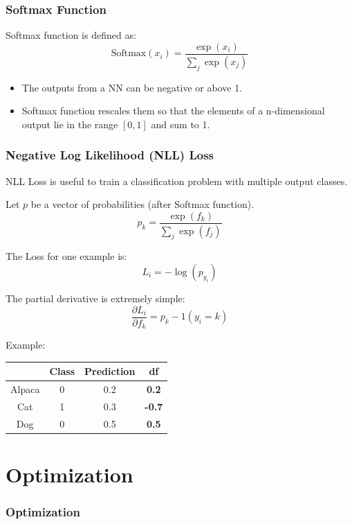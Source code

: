 \documentclass[aspectratio=169, 10pt]{beamer}
\begin{document}
\begin{frame}
    \frametitle{Softmax Function}
    Softmax function is defined as:
    \[
        \text{Softmax}(x_i) = \frac{\exp(x_i)}{ \sum_j \exp(x_j)}
    \]

    \begin{itemize}
        \item The outputs from a NN can be negative or above 1.
        \item Softmax function rescales them so that the elements of a n-dimensional output lie in the range $[0, 1]$ and sum to 1.
    \end{itemize}
        
\end{frame}

\begin{frame}
    \frametitle{Negative Log Likelihood (NLL) Loss}

    NLL Loss is useful to train a classification problem with multiple output classes.\break

    Let $p$ be a vector of probabilities (after Softmax function). 
    \[
        p_k = \frac{\exp(f_k)}{\sum_j \exp(f_j)}
    \]

    The Loss for one example is:
    \[
        L_i = - \log(p_{y_i})
    \]

    The partial derivative is extremely simple:
    \[
        \frac{\partial L_i}{\partial f_k} = p_k - 1(y_i = k)
    \]

    Example:
    \begin{table}[]
        \begin{tabular}{ccc|c}
         & \textbf{Class} & \textbf{Prediction} & \textbf{df} \\ \hline
        Alpaca & 0 & 0.2 & \textbf{0.2} \\
        Cat & 1 & 0.3 & \textbf{-0.7} \\
        Dog & 0 & 0.5 & \textbf{0.5} \\       
        \end{tabular}
    \end{table}
        
\end{frame}

\section{Optimization}
\begin{frame}
    \frametitle{Optimization}
        
\end{frame}
\end{document}

